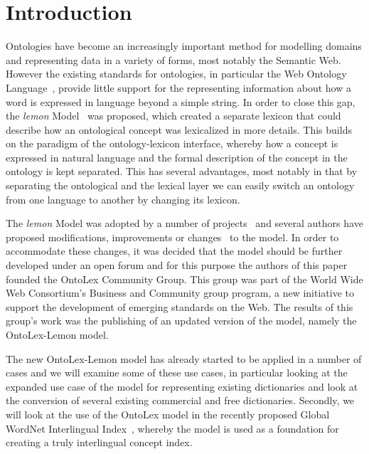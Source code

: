 \documentclass[12pt,a4paper]{elex2017}
\begin{document}

\section{Introduction}

Ontologies have become an increasingly important method for modelling domains and
representing data in a variety of forms, most notably the Semantic Web. However
the existing standards for ontologies, in particular the Web Ontology
Language~\citep[OWL]{mcguinness2004ow}, provide little support for the
representing information about how a word is expressed in language beyond a
simple string. In order to close this gap, the \emph{lemon}
Model~\citep{mccrae2012interchanging} was proposed, which created a separate
lexicon that could describe how an ontological concept was lexicalized in more
details. This builds on the paradigm of the ontology-lexicon interface, whereby
how a concept is expressed in natural language and the formal
description of the concept in the ontology is kept separated. This has several
advantages, most notably in that by separating the ontological and the lexical
layer we can easily switch an ontology from one language to another by changing
its lexicon. 

The \emph{lemon} Model was adopted by a number of
projects~\citep{navigli2012babelnet,serasset2015dbnary,ecklekohler2015} and
several authors have proposed modifications, improvements or
changes~\citep{khan2014using,chavula2014lemon,bosque2016linked}
to the model. In order to accommodate these changes, it was decided that the
model should be further developed under an open forum and for this purpose the
authors of this paper founded the OntoLex Community Group. This group was part
of the World Wide Web Consortium's Business and Community group program, a new
initiative to support the development of emerging standards on the Web. The
results of this group's work was the publishing of an updated version of the
model, namely the OntoLex-Lemon model.

The new OntoLex-Lemon model has already started to be applied in a number of cases
and we will examine some of these use cases, in particular looking at the
expanded use case of the model for representing existing dictionaries and look
at the conversion of several existing commercial and free dictionaries. Secondly, we will look at the
use of the OntoLex model in the recently proposed Global WordNet Interlingual
Index~\citep{vossen2016toward,bond2016cili}, whereby the model is used as a
foundation for creating a truly interlingual concept index.
\end{document}
